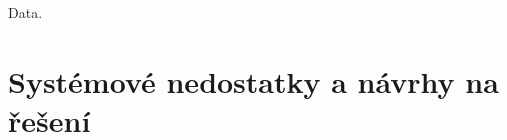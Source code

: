 \documentclass{article}
\begin{document}
\newpage

\thispagestyle{smallertextinheader}
Data.
\newpage

\section{Systémové nedostatky a návrhy na řešení}










\end{document}
